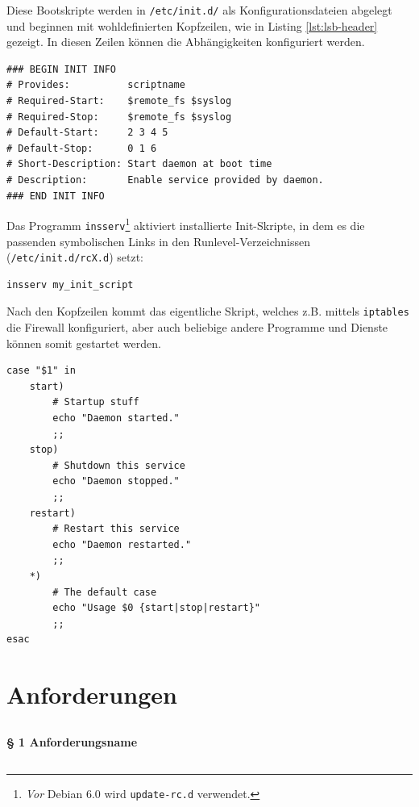 Diese Bootskripte werden in {\tt /etc/init.d/} als Konfigurationsdateien
abgelegt und beginnen mit wohldefinierten Kopfzeilen, wie in Listing
\ref{lst:lsb-header} gezeigt. In diesen Zeilen können die Abhängigkeiten
konfiguriert werden.

\begin{lstlisting}[label=lst:lsb-header,caption={Init Script LSB: Kopfzeilen.}]
### BEGIN INIT INFO
# Provides:          scriptname
# Required-Start:    $remote_fs $syslog
# Required-Stop:     $remote_fs $syslog
# Default-Start:     2 3 4 5
# Default-Stop:      0 1 6
# Short-Description: Start daemon at boot time
# Description:       Enable service provided by daemon.
### END INIT INFO
\end{lstlisting}


Das Programm {\tt insserv}\footnote{
\emph{Vor} Debian 6.0 wird {\tt update-rc.d} verwendet.
} aktiviert installierte Init-Skripte, in dem es die passenden symbolischen
Links in den Runlevel-Verzeichnissen ({\tt /etc/init.d/rcX.d}) setzt:

\begin{verbatim}
insserv my_init_script
\end{verbatim}

Nach den Kopfzeilen kommt das eigentliche Skript, welches z.B. mittels
{\tt iptables} die Firewall konfiguriert, aber auch beliebige andere Programme
und Dienste können somit gestartet werden.

\begin{lstlisting}[label=lst:lsb-script,caption={Init Script LSB: Eigentliches Skript.}]
case "$1" in
    start)
        # Startup stuff
        echo "Daemon started."
        ;;
    stop)
        # Shutdown this service
        echo "Daemon stopped."
        ;;
    restart)
        # Restart this service
        echo "Daemon restarted."
        ;;
    *)
        # The default case
        echo "Usage $0 {start|stop|restart}"
        ;;
esac
\end{lstlisting}


\section{Anforderungen}

\subsection{\fwa}

\paragraph{§ 1 Anforderungsname}

\subsection{\fwb}

